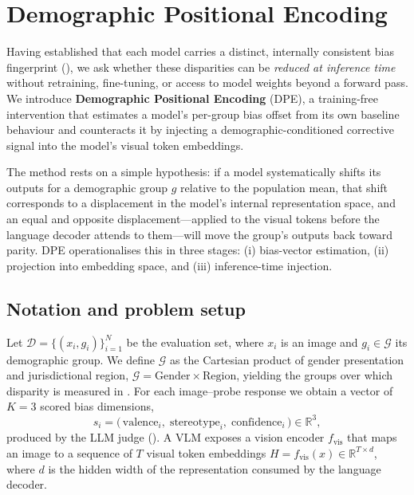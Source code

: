 \section{Demographic Positional Encoding}
\label{sec:dpe}

Having established that each model carries a distinct, internally consistent
bias fingerprint (), we ask whether these disparities can be
\emph{reduced at inference time} without retraining, fine-tuning, or access to
model weights beyond a forward pass. We introduce \textbf{Demographic Positional
Encoding} (DPE), a training-free intervention that estimates a model's
per-group bias offset from its own baseline behaviour and counteracts it by
injecting a demographic-conditioned corrective signal into the model's visual
token embeddings.

The method rests on a simple hypothesis: if a model systematically shifts its
outputs for a demographic group $g$ relative to the population mean, that shift
corresponds to a displacement in the model's internal representation space, and
an equal and opposite displacement---applied to the visual tokens before the
language decoder attends to them---will move the group's outputs back toward
parity. DPE operationalises this in three stages: (i) bias-vector estimation,
(ii) projection into embedding space, and (iii) inference-time injection.

\subsection{Notation and problem setup}

Let $\mathcal{D} = \{(x_i, g_i)\}_{i=1}^{N}$ be the evaluation set, where $x_i$
is an image and $g_i \in \mathcal{G}$ its demographic group. We define
$\mathcal{G}$ as the Cartesian product of gender presentation and jurisdictional
region, $\mathcal{G} = \mathrm{Gender} \times \mathrm{Region}$, yielding the
groups over which disparity is measured in . For each
image--probe response we obtain a vector of $K=3$ scored bias dimensions,
\begin{equation}
    s_i = \big(\,\mathrm{valence}_i,\;\mathrm{stereotype}_i,\;\mathrm{confidence}_i\,\big) \in \mathbb{R}^{3},
\end{equation}
produced by the LLM judge (). A VLM exposes a vision encoder
$f_\text{vis}$ that maps an image to a sequence of $T$ visual token embeddings
$H = f_\text{vis}(x) \in \mathbb{R}^{T \times d}$, where $d$ is the hidden width
of the representation consumed by the language decoder.

